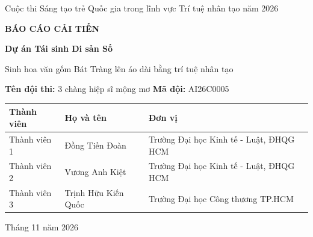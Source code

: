 \documentclass[12pt,a4paper]{report}
\begin{document}
\begin{titlepage}
\centering
\vspace*{2cm}
{\large Cuộc thi Sáng tạo trẻ Quốc gia trong lĩnh vực Trí tuệ nhân tạo năm 2026\par}
\vspace{2.5cm}
{\Huge\bfseries BÁO CÁO CẢI TIẾN\par}
\vspace{0.8cm}
{\Large\bfseries Dự án Tái sinh Di sản Số\par}
\vspace{0.4cm}
{\large Sinh hoa văn gốm Bát Tràng lên áo dài bằng trí tuệ nhân tạo\par}
\vspace{3cm}
{\large\textbf{Tên đội thi:} 3 chàng hiệp sĩ mộng mơ \qquad \textbf{Mã đội:} AI26C0005\par}
\vspace{0.6cm}
\begin{tabular}{@{}>{\raggedright\arraybackslash}p{2.6cm}>{\raggedright\arraybackslash}p{4.4cm}>{\raggedright\arraybackslash}p{7.2cm}@{}}
\toprule
\textbf{Thành viên} & \textbf{Họ và tên} & \textbf{Đơn vị} \\
\midrule
Thành viên 1 & Đồng Tiến Đoàn & Trường Đại học Kinh tế - Luật, ĐHQG HCM \\
Thành viên 2 & Vương Anh Kiệt & Trường Đại học Kinh tế - Luật, ĐHQG HCM \\
Thành viên 3 & Trịnh Hữu Kiến Quốc & Trường Đại học Công thương TP.HCM \\
\bottomrule
\end{tabular}
\vfill
{\large Tháng 11 năm 2026\par}
\end{titlepage}

\tableofcontents
\clearpage
\listoffigures
\clearpage

\end{document}
